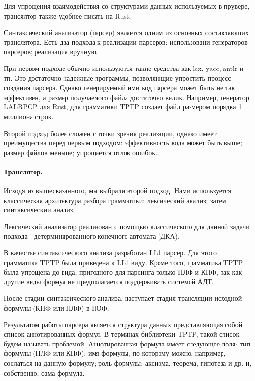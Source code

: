 \documentclass[a4paper]{jctart15b}
\begin{document}
Для упрощения взаимодействия со структурами данных используемых в прувере, трансялтор также удобнее писать на Rust.

Синтаксический анализатор (парсер) является одним из основных составляющих транслятора. Есть два подхода к реализации парсеров: использовани генераторов парсеров; реализация вручную.

При первом подходе обычно используются такие средства как lex, yacc, antlr и тп. Это достаточно надежные программы, позволяющие упростить процесс создания парсера. Однако генерируемый ими код парсера может быть не так эффективен, а размер получаемого файла достаточно велик. Например, генератор LALRPOP для Rust, для грамматики TPTP создает файл размером порядка 1 миллиона строк.

Второй подход более сложен с точки зрения реализации, однако имеет преимущества перед первым подходом: эффективность кода может быть выше; размер файлов меньше; упрощается отлов ошибок.

\paragraph{Транслятор.}
Исходя из вышесказанного, мы выбрали второй подход. Нами используется классическая архитектура разбора грамматики: лексический анализ; затем синтаксический анализ.

Лексический анализатор реализован с помощью классического для данной задачи подхода - детерминированного конечного автомата (ДКА).

В качестве синтаксического анализа разработан LL1 парсер. Для этого грамматика TPTP была приведена к LL1 виду. Кроме того, грамматика TPTP была упрощена до вида, пригодного для парсинга только ПЛФ и КНФ, так как другие виды формул не предполагается поддерживать системой АДТ.

После стадии синтаксического анализа, наступает стадия трансляции исходной формулы (КНФ или ПЛФ) в ПОФ. %

Результатом работы парсера является структура данных представляющая собой список аннотированных формул. В терминах библиотеки TPTP, такой список будем называть проблемой. Аннотированная формула имеет следующее поля: тип формулы (ПЛФ или КНФ); имя формулы, по которому можно, например, сослаться на данную формулу; роль формулы: аксиома, теорема, гипотеза и др. и, собственно, сама формула.
\end{document}
